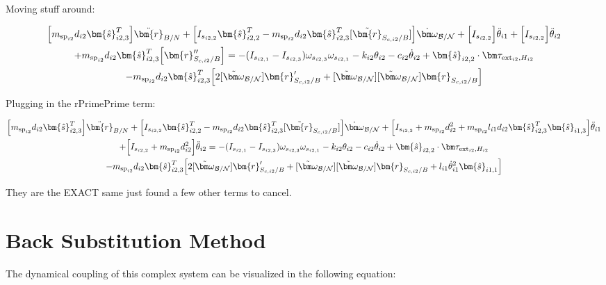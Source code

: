 \documentclass[paper]{aiaaNew}
\begin{document}
Moving stuff around:

\begin{multline}
\Big[m_{\text{sp}_{i2}} d_{i2}\bm{\hat{s}}_{i2,3}^T\Big] \ddot{\bm{r}}_{B/N} + \Big[I_{s_{i2,2}} \bm{\hat{s}}_{i2,2}^T - m_{\text{sp}_{i2}} d_{i2}\bm{\hat{s}}_{i2,3}^T  [\tilde{\bm{r}}_{S_{c,i2}/B}] \Big] \dot{\bm \omega}_{\cal{B/N}} + \Big[I_{s_{i2,2}}\Big] \ddot{\theta}_{i1}  + \Big[I_{s_{i2,2}}\Big] \ddot{\theta}_{i2} \\+ m_{\text{sp}_{i2}} d_{i2}\bm{\hat{s}}_{i2,3}^T \Big[ \bm{r}''_{S_{c,i2}/B}\Big] 
= - (I_{s_{i2,1}} - I_{s_{i2,3}}) \omega_{s_{i2,3}} \omega_{s_{i2,1}} -k_{i2} \theta_{i2} - c_{i2} \dot{\theta}_{i2}
+ \bm{\hat{s}}_{i2,2} \cdot \bm \tau_{\text{ext}_{i2},H_{i2}} \\
- m_{\text{sp}_{i2}} d_{i2}\bm{\hat{s}}_{i2,3}^T \Big[ 2 [\tilde{\bm\omega}_{\cal B/N}] \bm{r}'_{S_{c,i2}/B} 
+ [\tilde{\bm\omega}_{\cal B/N}] [\tilde{\bm\omega}_{\cal B/N}] \bm{r}_{S_{c,i2}/B}\Big]
\end{multline}

Plugging in the rPrimePrime term:

\begin{multline}
	\Big[m_{\text{sp}_{i2}} d_{i2}\bm{\hat{s}}_{i2,3}^T\Big] \ddot{\bm{r}}_{B/N} + \Big[I_{s_{i2,2}} \bm{\hat{s}}_{i2,2}^T - m_{\text{sp}_{i2}} d_{i2}\bm{\hat{s}}_{i2,3}^T  [\tilde{\bm{r}}_{S_{c,i2}/B}] \Big] \dot{\bm \omega}_{\cal{B/N}} + \Big[I_{s_{i2,2}}+ m_{\text{sp}_{i2}} d_{i2}^2 + m_{\text{sp}_{i2}} l_{i1} d_{i2} \bm{\hat{s}}_{i2,3}^T \bm{\hat{s}}_{i1,3} \Big] \ddot{\theta}_{i1}  \\
	+ \Big[I_{s_{i2,2}} + m_{\text{sp}_{i2}} d_{i2}^2 \Big] \ddot{\theta}_{i2} 
	= - (I_{s_{i2,1}} - I_{s_{i2,3}}) \omega_{s_{i2,3}} \omega_{s_{i2,1}} -k_{i2} \theta_{i2} - c_{i2} \dot{\theta}_{i2}
	+ \bm{\hat{s}}_{i2,2} \cdot \bm \tau_{\text{ext}_{i2},H_{i2}} \\
	- m_{\text{sp}_{i2}} d_{i2}\bm{\hat{s}}_{i2,3}^T \Big[ 2 [\tilde{\bm\omega}_{\cal B/N}] \bm{r}'_{S_{c,i2}/B} 
	+ [\tilde{\bm\omega}_{\cal B/N}] [\tilde{\bm\omega}_{\cal B/N}] \bm{r}_{S_{c,i2}/B} + l_{i1} \dot{\theta}_{i1}^2 \bm{\hat{s}}_{i1,1}\Big]
\end{multline}

They are the EXACT same just found a few other terms to cancel.

	\section{Back Substitution Method}
	The dynamical coupling of this complex system can be visualized in the following equation:
	
\end{document}

